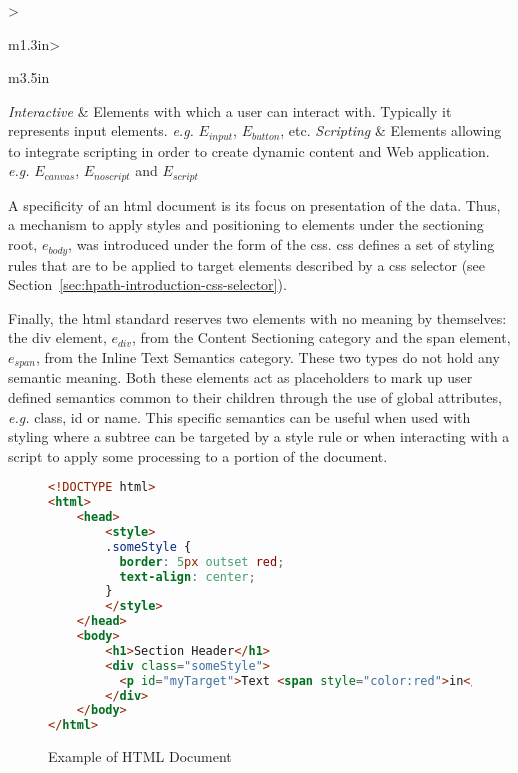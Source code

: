 \begin{table}
\begin{tabular}{>{\raggedright}m{1.3in}>{\raggedright}m{3.5in}}
\scriptsize{\textit{Interactive}} & \scriptsize{Elements with which a user can interact with. Typically it represents input elements. \emph{e.g.} $E_{input}$, $E_{button}$, etc.} \tabularnewline
\scriptsize{\textit{Scripting}} & \scriptsize{Elements allowing to integrate scripting in order to create dynamic content and Web application. \emph{e.g.} $E_{canvas}$, $E_{noscript}$ and $E_{script}$} \tabularnewline
\bottomrule
\end{tabular}
\parnotes
\end{table}

A specificity of an \gls{html} document is its focus on presentation of the data. Thus, a mechanism to apply styles and positioning to elements under the sectioning root, $e_{body}$, was introduced under the form of the \gls{css}. \gls{css} defines a set of styling rules that are to be applied to target elements described by a \gls{css} selector (see Section~\ref{sec:hpath-introduction-css-selector}).

Finally, the \gls{html} standard reserves two elements with no meaning by themselves: the div element, $e_{div}$, from the Content Sectioning category and the span element, $e_{span}$, from the Inline Text Semantics category. These two types do not hold any semantic meaning. Both these elements act as placeholders to mark up user defined semantics common to their children through the use of global attributes, \emph{e.g.} class, id or name. This specific semantics can be useful when used with styling where a subtree can be targeted by a style rule or when interacting with a script to apply some processing to a portion of the document.

\begin{figure}
\centering
\caption{Example of HTML Document}
\label{fig:html-document}
\begin{minipage}{0.8\linewidth}
\begin{lstlisting}[language=HTML]
<!DOCTYPE html>
<html>
    <head>
        <style>
        .someStyle {
          border: 5px outset red;
          text-align: center;
        }
        </style>
    </head>
    <body>
        <h1>Section Header</h1>
        <div class="someStyle">
          <p id="myTarget">Text <span style="color:red">in</span> a div.</p>
        </div>
    </body>
</html>
\end{lstlisting}
\end{minipage}
\end{figure}


